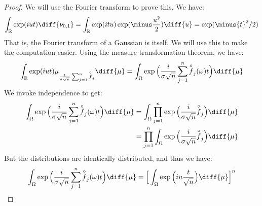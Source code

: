         \begin{proof}
            We will use the Fourier transform to prove this.
            We have:
            \begin{equation}
                \int_{\mathbb{R}}\exp(iut)
                    \diff{\nu_{0,1}}=
                \int_{\mathbb{R}}\exp(itu)
                    \exp(\minus\frac{u^{2}}{2})\diff{u}
                    =\exp(\minus{t}^{2}/2)
            \end{equation}
            That is, the Fourier transform of a Gaussian
            is itself. We will use this to make the
            computation easier. Using the measure
            transformation theorem, we have:
            \begin{equation}
                \int_{\mathbb{R}}\exp(iut)
                \mu_{\frac{1}{\sigma\sqrt{n}}
                    \sum_{j=1}^{n}\overset{\circ}{f}_{j}}
                    \diff{\mu}
                =\int_{\Omega}\exp\Big(
                    \frac{i}{\sigma\sqrt{n}}\sum_{j=1}^{n}
                    \overset{\circ}{f}_{j}(\omega)t\Big)
                    \diff{\mu}
            \end{equation}
            We invoke independence to get:
            \begin{subequations}
                \begin{align}
                    \int_{\Omega}\exp\Big(
                        \frac{i}{\sigma\sqrt{n}}\sum_{j=1}^{n}
                        \overset{\circ}{f}_{j}(\omega)t\Big)
                        \diff{\mu}
                    &=\int_{\Omega}\prod_{j=1}^{n}
                        \exp\Big(\frac{i}{\sigma\sqrt{n}}
                        \overset{\circ}{f}_{j}\Big)\diff{\mu}\\
                    &=\prod_{j=1}^{n}\int_{\Omega}
                        \exp\Big(\frac{i}{\sigma\sqrt{n}}
                        \overset{\circ}{f}_{j}\Big)\diff{\mu}
                \end{align}
            \end{subequations}
            But the distributions are identically distributed,
            and thus we have:
            \begin{equation}
                \int_{\Omega}\exp\Big(
                    \frac{i}{\sigma\sqrt{n}}\sum_{j=1}^{n}
                    \overset{\circ}{f}_{j}(\omega)t\Big)
                    \diff{\mu}=
                \Big[\int_{\Omega}\exp\Big(
                    iu\frac{t}{\sqrt{n}}\Big)
                    \diff{\mu}\Big]^{n}
            \end{equation}

\end{proof}
